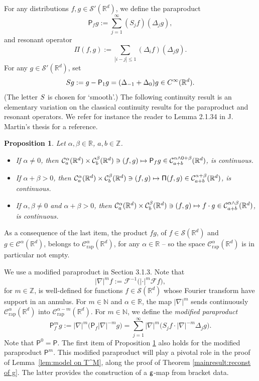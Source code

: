 \documentclass[11pt]{article}
\numberwithin{equation}{section}
\newcommand\mto{\mathchoice{\longmapsto}{\mapsto}{\mapsto}{\mapsto}}
\theoremstyle{plain}
\newtheorem{prop}[thm]{Proposition}
\theoremstyle{definition}
\newcommand{\rap}{\mathrm{rap}}
\newcommand{\sfP}{\mathsf{P}}
\newcommand{\sfPi}{\mathsf{\Pi}}
\newcommand{\bbN}{\mathbb{N}}
\newcommand{\bbR}{\mathbb{R}}
\newcommand{\mcC}{\mathcal{C}}
\newcommand{\mcF}{\mathcal{F}}
\newcommand\mcS{\mathcal{S}}
\begin{document}
For any distributions $f,g\in\mcS'(\bbR^d)$, we define the paraproduct\vspace*{-3pt}
\[
\sfP_fg:=\sum_{j=1}^\infty (S_jf) (\Delta_jg),
\]
and resonant operator\vspace*{-3pt}
\[
\sfPi(f,g):=\sum_{|i-j|\le1}(\Delta_if)(\Delta_jg).
\]
For any $g\in\mcS'(\bbR^d)$, set
\begin{equation} \label{EqDefnSmoothS}
\textsc{S} g := g - \sfP_1g = (\Delta_{-1} + \Delta_0)g \in C^\infty(\bbR^d).
\end{equation}
(The letter $\textsc{S}$ is chosen for `smooth'.) The following continuity result is an elementary variation on the classical continuity results for the paraproduct and resonant operators. We refer for instance the reader to Lemma 2.1.34 in J. Martin's thesis \cite{MartinThesis} for a reference.

\begin{prop}\label{prop:continuity of the paraproduct}
Let $\alpha,\beta\in\bbR$, $a,b\in\mathbb{Z}$.
\begin{itemize}
\item If $\alpha\neq0$, then $\mcC_a^\alpha(\bbR^d)\times \mcC_b^\beta(\bbR^d)\ni(f,g)\mto\sfP_fg\in \mcC_{a+b}^{\alpha\wedge0+\beta}(\bbR^d)$, is continuous.
\item If $\alpha+\beta>0$, then $\mcC_a^\alpha(\bbR^d)\times \mcC_b^\beta(\bbR^d)\ni(f,g)\mto\sfPi(f,g)\in \mcC_{a+b}^{\alpha+\beta}(\bbR^d)$, is continuous.
\item If $\alpha,\beta\neq0$ and $\alpha+\beta>0$, then $\mcC_a^\alpha(\bbR^d)\times \mcC_b^\beta(\bbR^d)\ni(f,g)\mto f\cdot g\in \mcC_{a+b}^{\alpha\wedge\beta}(\bbR^d)$, is continuous.
\end{itemize}
\end{prop}

As a consequence of the last item, the product $fg$, of $f\in\mcS(\bbR^d)$ and $g\in \mcC^\alpha(\bbR^d)$, belongs to $\mcC_\rap^\alpha(\bbR^d)$, for any $\alpha\in\bbR$ -- so the space $\mcC_\rap^\alpha(\bbR^d)$ is in particular not empty.

We use a modified paraproduct in Section 3.1.3. Note that
\[
|\nabla|^m f:=\mcF^{-1}\bigl(|{\cdot}|^m\mcF f\bigr),
\]
for $m\in\mathbb{Z}$, is well-defined for functions $f\in\mcS(\bbR^d)$ whose Fourier transform have support in an annulus. For $m\in\bbN$ and $\alpha\in\bbR$, the map $|\nabla|^m$ sends continuously $\mcC_\rap^\alpha(\bbR^d)$ into $\mcC_\rap^{\alpha-m}(\bbR^d)$. For $m\in\bbN$, we define the \emph{{modified paraproduct}}\vspace*{-3pt}
\[
\sfP_f^m g := |\nabla|^m\bigl(\sfP_f|\nabla|^{-m}g\bigr) = \sum_{j=1}^\infty|\nabla|^m\bigl(S_jf\cdot|\nabla|^{-m}\Delta_jg\bigr).
\]
Note that $\sfP^0=\sfP$. The first item of Proposition \ref{prop:continuity of the paraproduct} also holds for the modified paraproduct $\sfP^m$. This modified paraproduct will play a pivotal role in the proof of Lemma~\ref{lem:model on T^M}, along the proof of Theorem \ref{mainresult:reconst of g}. The latter provides the construction of a $\sf g$-map from bracket data.
\end{document}
